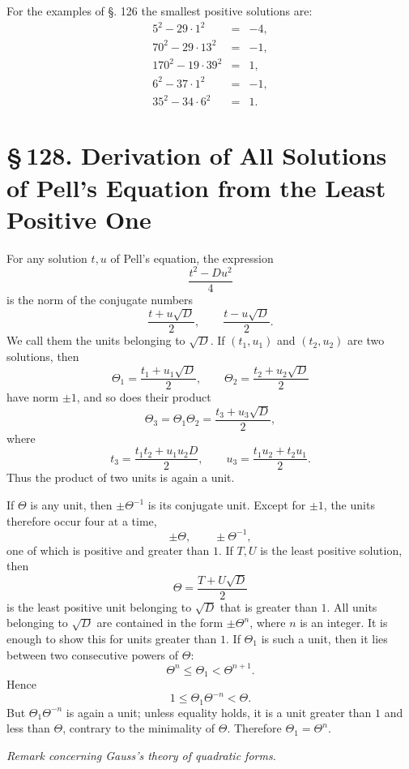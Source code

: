 \documentclass[11pt]{article}
\providecommand{\sect}[2]{\section*{\S\,#1. #2}}
\begin{document}
For the examples of §. 126 the smallest positive solutions are:
\[
\begin{array}{rcl}
5^2-29\cdot1^2&=&-4,\\
70^2-29\cdot13^2&=&-1,\\
170^2-19\cdot39^2&=&1,\\
6^2-37\cdot1^2&=&-1,\\
35^2-34\cdot6^2&=&1.
\end{array}
\]

\sect{128}{Derivation of All Solutions of Pell's Equation from the Least Positive One}

For any solution $t,u$ of Pell's equation, the expression
\[
        \frac{t^2-Du^2}{4}
\]
is the norm of the conjugate numbers
\[
        \frac{t+u\sqrt D}{2},\qquad \frac{t-u\sqrt D}{2}.
\]
We call them the units belonging to $\sqrt D$. If $(t_1,u_1)$ and $(t_2,u_2)$ are two solutions, then
\[
        \Theta_1=\frac{t_1+u_1\sqrt D}{2},\qquad
        \Theta_2=\frac{t_2+u_2\sqrt D}{2}
\]
have norm $\pm1$, and so does their product
\[
        \Theta_3=\Theta_1\Theta_2=\frac{t_3+u_3\sqrt D}{2},
\]
where
\[
        t_3=\frac{t_1t_2+u_1u_2D}{2},\qquad
        u_3=\frac{t_1u_2+t_2u_1}{2}.
\]
Thus the product of two units is again a unit.

If $\Theta$ is any unit, then $\pm\Theta^{-1}$ is its conjugate unit. Except for $\pm1$, the units therefore occur four at a time,
\[
        \pm\Theta,\qquad \pm\Theta^{-1},
\]
one of which is positive and greater than $1$. If $T,U$ is the least positive solution, then
\[
        \Theta=\frac{T+U\sqrt D}{2}
\]
is the least positive unit belonging to $\sqrt D$ that is greater than $1$. All units belonging to $\sqrt D$ are contained in the form $\pm\Theta^n$, where $n$ is an integer. It is enough to show this for units greater than $1$. If $\Theta_1$ is such a unit, then it lies between two consecutive powers of $\Theta$:
\[
        \Theta^n\le\Theta_1<\Theta^{n+1}.
\]
Hence
\[
        1\le \Theta_1\Theta^{-n}<\Theta.
\]
But $\Theta_1\Theta^{-n}$ is again a unit; unless equality holds, it is a unit greater than $1$ and less than $\Theta$, contrary to the minimality of $\Theta$. Therefore $\Theta_1=\Theta^n$.

\begin{center}
\textit{Remark concerning Gauss's theory of quadratic forms.}
\end{center}
\end{document}
